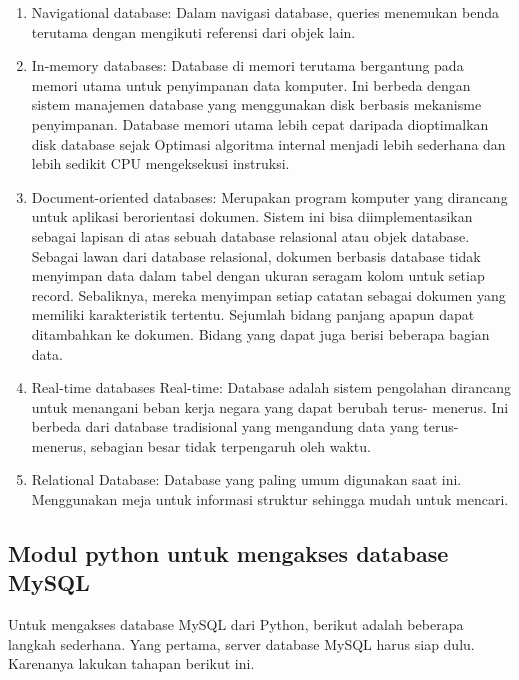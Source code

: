 \begin{enumerate}
		\item Navigational database: 
			Dalam navigasi database, queries menemukan benda terutama dengan mengikuti referensi dari objek lain.
 
		\item In-memory databases: 
			Database di memori terutama bergantung pada memori utama untuk penyimpanan data komputer. Ini berbeda dengan sistem manajemen database yang menggunakan disk berbasis mekanisme penyimpanan. Database memori utama lebih cepat daripada dioptimalkan disk database sejak Optimasi algoritma internal menjadi lebih sederhana dan lebih sedikit CPU mengeksekusi instruksi.

		\item Document-oriented databases: 
			Merupakan program komputer yang dirancang untuk aplikasi berorientasi dokumen. Sistem ini bisa diimplementasikan sebagai lapisan di atas sebuah database relasional atau objek database. Sebagai lawan dari database relasional, dokumen berbasis database tidak menyimpan data dalam tabel dengan ukuran seragam kolom untuk setiap record. Sebaliknya, mereka menyimpan setiap catatan sebagai dokumen yang memiliki karakteristik tertentu. Sejumlah bidang panjang apapun dapat ditambahkan ke dokumen. Bidang yang dapat juga berisi beberapa bagian data. 
 
		\item Real-time databases Real-time: 
			Database adalah sistem pengolahan dirancang untuk menangani beban kerja negara yang dapat berubah terus- menerus. Ini berbeda dari database tradisional yang mengandung data yang terus- menerus, sebagian besar tidak terpengaruh oleh waktu. 
 
		\item Relational Database: 
			Database yang paling umum digunakan saat ini. Menggunakan meja untuk informasi struktur sehingga mudah untuk mencari.
	\end{enumerate}
 
\subsection {Modul python untuk mengakses database MySQL}
	Untuk mengakses database MySQL dari Python, berikut adalah beberapa langkah sederhana. Yang pertama, server database MySQL harus siap dulu. Karenanya lakukan tahapan berikut ini. 

